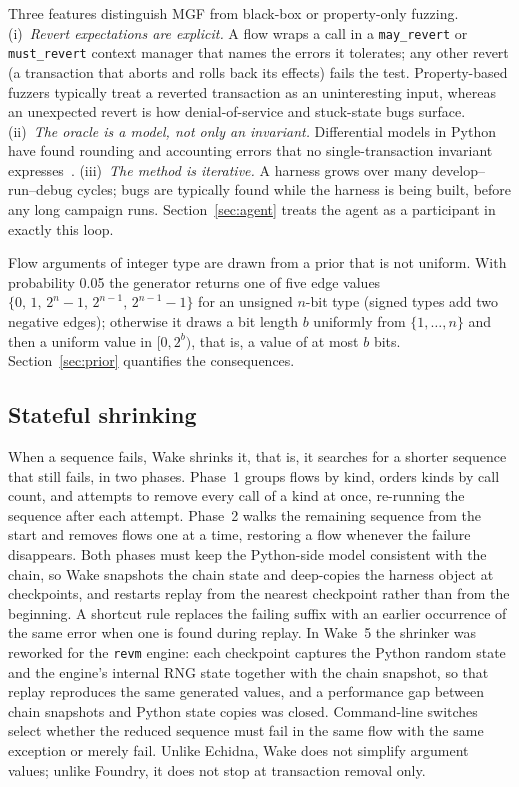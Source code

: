 \documentclass[11pt,a4paper]{article}
\newcommand{\wake}{Wake}
\newcommand{\revm}{\texttt{revm}}
\begin{document}
Three features distinguish MGF from black-box or property-only fuzzing. (i)~\emph{Revert expectations are explicit.} A flow wraps a call in a \texttt{may\_revert} or \texttt{must\_revert} context manager that names the errors it tolerates; any other revert (a transaction that aborts and rolls back its effects) fails the test. Property-based fuzzers typically treat a reverted transaction as an uninteresting input, whereas an unexpected revert is how denial-of-service and stuck-state bugs surface. (ii)~\emph{The oracle is a model, not only an invariant.} Differential models in Python have found rounding and accounting errors that no single-transaction invariant expresses~\cite{ipor2023audit}. (iii)~\emph{The method is iterative.} A harness grows over many develop--run--debug cycles; bugs are typically found while the harness is being built, before any long campaign runs. Section~\ref{sec:agent} treats the agent as a participant in exactly this loop.

Flow arguments of integer type are drawn from a prior that is not uniform. With probability 0.05 the generator returns one of five edge values $\{0,\,1,\,2^{n}-1,\,2^{n-1},\,2^{n-1}-1\}$ for an unsigned $n$-bit type (signed types add two negative edges); otherwise it draws a bit length $b$ uniformly from $\{1,\dots,n\}$ and then a uniform value in $[0,2^{b})$, that is, a value of at most $b$ bits. Section~\ref{sec:prior} quantifies the consequences.

\subsection{Stateful shrinking}
\label{sec:shrink}

When a sequence fails, \wake{} shrinks it, that is, it searches for a shorter sequence that still fails, in two phases. Phase~1 groups flows by kind, orders kinds by call count, and attempts to remove every call of a kind at once, re-running the sequence after each attempt. Phase~2 walks the remaining sequence from the start and removes flows one at a time, restoring a flow whenever the failure disappears. Both phases must keep the Python-side model consistent with the chain, so \wake{} snapshots the chain state and deep-copies the harness object at checkpoints, and restarts replay from the nearest checkpoint rather than from the beginning. A shortcut rule replaces the failing suffix with an earlier occurrence of the same error when one is found during replay. In \wake{}~5 the shrinker was reworked for the \revm{} engine: each checkpoint captures the Python random state and the engine's internal RNG state together with the chain snapshot, so that replay reproduces the same generated values, and a performance gap between chain snapshots and Python state copies was closed. Command-line switches select whether the reduced sequence must fail in the same flow with the same exception or merely fail. Unlike Echidna, \wake{} does not simplify argument values; unlike Foundry, it does not stop at transaction removal only.
\end{document}
